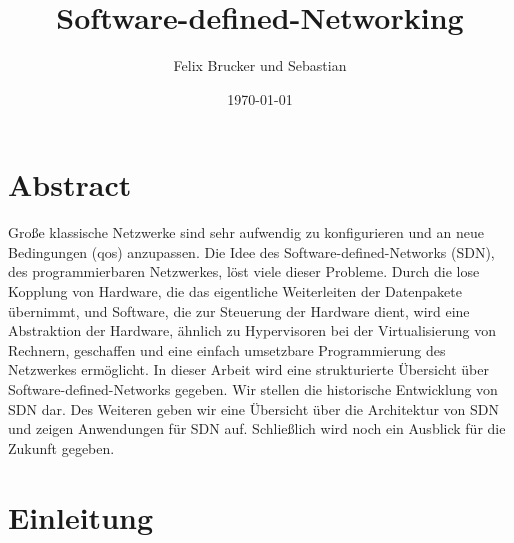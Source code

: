 \documentclass[twoside,12pt]{scrartcl}
\title{Software-defined-Networking}
\author{Felix Brucker und Sebastian}
\date{\today}
\begin{document}
	
	
	
	\pagestyle{scrheadings}
	\clearscrheadfoot
	\ohead{\leftmark}
	\ifoot{\pagemark} 
	\setheadsepline{1pt} 
	\setfootsepline{1pt}
	
	
	\maketitle
	
	\tableofcontents
	
	\newpage
	
	\printglossary[type=\acronymtype,style=longwithindent]
	\newpage
	
	\section{Abstract}
	
	Große klassische Netzwerke sind sehr aufwendig zu konfigurieren und an neue Bedingungen (qos) anzupassen. Die Idee des Software-defined-Networks (SDN), des programmierbaren Netzwerkes, löst viele dieser Probleme. Durch die lose Kopplung von Hardware, die das eigentliche Weiterleiten der Datenpakete übernimmt, und Software, die zur Steuerung der Hardware dient, wird eine Abstraktion der Hardware, ähnlich zu Hypervisoren bei der Virtualisierung von Rechnern, geschaffen und eine einfach umsetzbare Programmierung des Netzwerkes ermöglicht. In dieser Arbeit wird eine strukturierte Übersicht über Software-defined-Networks gegeben. Wir stellen die historische Entwicklung von SDN dar. Des Weiteren geben wir eine Übersicht über die Architektur von SDN und zeigen Anwendungen für SDN auf. Schließlich wird noch ein Ausblick für die Zukunft gegeben.
	
	\section{Einleitung}
	

	\onehalfspacing
	
\end{document}
